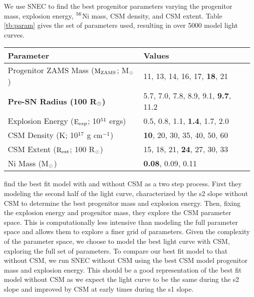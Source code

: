 \documentclass[a4paper,fleqn,usenatbib]{mnras}
\newcommand{\msunperiod}{M$\rm{_{\odot}}$}
\begin{document}
We use SNEC to find the best progenitor parameters varying the progenitor mass, explosion energy, $\rm{{}^{56}}$Ni mass, CSM density, and CSM extent. 
Table \ref{tb:param} gives the set of parameters used, resulting in over 5000 model light curves.
\begin{table*}
\centering
\caption{The grid of parameters used by SNEC. 
The values that best fit the data are in bold.}
\label{tb:param}
\begin{tabular}{l|l}
\hline
Parameter & Values \\
\hline
Progenitor ZAMS Mass ($\rm{M_{ZAMS}}$; \msunperiod) & 11, 13, 14, 16, 17, {\bf 18}, 21 \\
\textbf{Pre-SN Radius (100 R$\rm{_{\odot}}$) }                    & 5.7, 7.0, 7.8, 8.9, 9.1, {\bf 9.7}, 11.2 \\
Explosion Energy ($\rm{E_{exp}}$; 10$\rm{^{51}}$ ergs)   & 0.5, 0.8, 1.1, {\bf 1.4}, 1.7, 2.0 \\
CSM Density (K; 10$\rm{^{17}}$ g $\rm{cm^{-1}}$)            & {\bf 10}, 20, 30, 35, 40, 50, 60 \\
CSM Extent ($\rm{R_{ext}}$; 100 R$\rm{_{\odot}}$)           & 15, 18, 21, {\bf 24}, 27, 30, 33 \\
Ni Mass (\msunperiod)                                                        & {\bf 0.08}, 0.09, 0.11 \\
\hline
\end{tabular}
\end{table*}
\citet{2018morozova} find the best fit model with and without CSM as a two step process. 
First they modeling the second half of the light curve, characterized by the s2 slope without CSM to determine the best progenitor mass and explosion energy. 
Then, fixing the explosion energy and progenitor mass, they explore the CSM parameter space. 
This is computationally less intensive than modeling the full parameter space and allows them to explore a finer grid of parameters.
Given the complexity of the parameter space, we choose to model the best light curve with CSM, exploring the full set of parameters. 
To compare our best fit model to that without CSM, we run SNEC without CSM using the best CSM model progenitor mass and explosion energy.
This should be a good representation of the best fit model without CSM as we expect the light curve to be the same during the s2 slope and improved by CSM at early times during the s1 slope.
\end{document}
